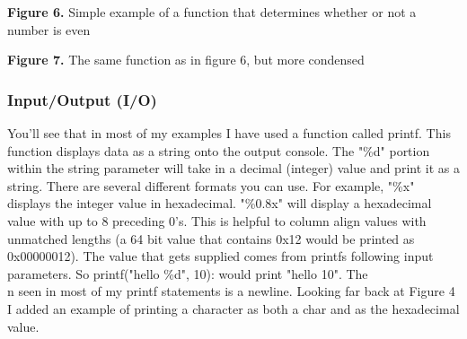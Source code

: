 \documentclass[paper=a4, fontsize=11pt]{scrartcl}
\numberwithin{equation}{section}		%
\numberwithin{figure}{section}			%
\numberwithin{table}{section}			%
\begin{document}
\vskip 0.05in
\centerline{\textbf{Figure 6. }Simple example of a function that determines whether or not a number is even}
\vskip 0.1in

\vskip 0.05in
\centerline{\textbf{Figure 7. }The same function as in figure 6, but more condensed}
\vskip 0.1in

\subsubsection{Input/Output (I/O)}
You'll see that in most of my examples I have used a function called printf. This function displays data as a string onto the output console. The "\%d" portion within the string parameter will take in a decimal (integer) value and print it as a string. There are several different formats you can use. For example, "\%x" displays the integer value in hexadecimal. "\%0.8x" will display a hexadecimal value with up to 8 preceding 0's. This is helpful to column align values with unmatched lengths (a 64 bit value that contains 0x12 would be printed as 0x00000012). The value that gets supplied comes from printfs following input parameters. So printf("hello \%d", 10): would print "hello 10". The \\n seen in most of my printf statements is a newline. Looking far back at Figure 4 I added an example of printing a character as both a char and as the hexadecimal value.
\end{document}
